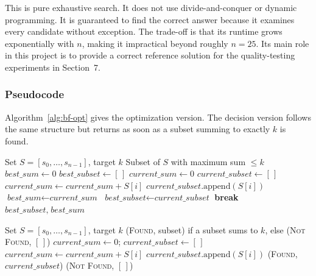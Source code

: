 \documentclass[12pt,a4paper]{article}
\theoremstyle{definition}
\begin{document}
This is pure exhaustive search. It does not use divide-and-conquer or dynamic
programming. It is guaranteed to find the correct answer because it examines
every candidate without exception. The trade-off is that its runtime grows
exponentially with $n$, making it impractical beyond roughly $n = 25$. Its
main role in this project is to provide a correct reference solution for the
quality-testing experiments in Section~7.

\subsubsection{Pseudocode}

Algorithm~\ref{alg:bf-opt} gives the optimization version. The decision version
follows the same structure but returns as soon as a subset summing to exactly
$k$ is found.

\begin{algorithm}[H]
\caption{Brute Force Optimization}
\label{alg:bf-opt}
\begin{algorithmic}[1]
\Require Set $S = [s_0, \ldots, s_{n-1}]$, target $k$
\Ensure Subset of $S$ with maximum sum $\leq k$
\State $\textit{best\_sum} \gets 0$
\State $\textit{best\_subset} \gets [\,]$
    \State $\textit{current\_sum} \gets 0$
    \State $\textit{current\_subset} \gets [\,]$
            \State $\textit{current\_sum} \gets \textit{current\_sum} + S[i]$
            \State $\textit{current\_subset}.\mathrm{append}(S[i])$
        \EndIf
    \EndFor
        \State $\textit{best\_sum} \gets \textit{current\_sum}$
        \State $\textit{best\_subset} \gets \textit{current\_subset}$
    \EndIf
        \State \textbf{break} 
    \EndIf
\EndFor
\State \Return $\textit{best\_subset},\; \textit{best\_sum}$
\end{algorithmic}
\end{algorithm}

\begin{algorithm}[H]
\caption{Brute Force Decision}
\label{alg:bf-dec}
\begin{algorithmic}[1]
\Require Set $S = [s_0, \ldots, s_{n-1}]$, target $k$
\Ensure (\textsc{Found}, subset) if a subset sums to $k$, else (\textsc{Not Found}, $[\,]$)
    \State $\textit{current\_sum} \gets 0$; \quad $\textit{current\_subset} \gets [\,]$
            \State $\textit{current\_sum} \gets \textit{current\_sum} + S[i]$
            \State $\textit{current\_subset}.\mathrm{append}(S[i])$
        \EndIf
    \EndFor
        \State \Return (\textsc{Found}, $\textit{current\_subset}$)
    \EndIf
\EndFor
\State \Return (\textsc{Not Found}, $[\,]$)
\end{algorithmic}
\end{algorithm}
\end{document}
